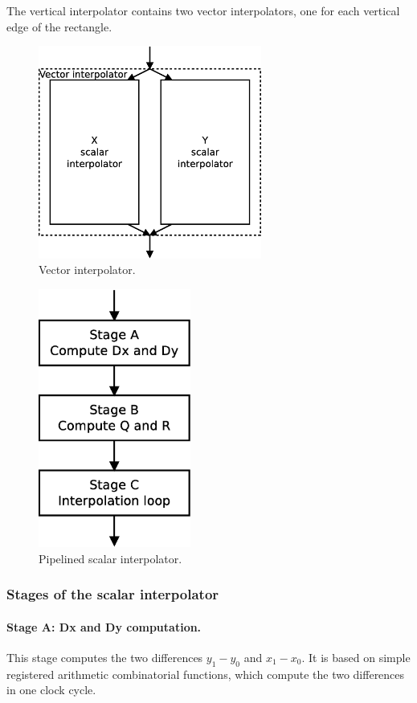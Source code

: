 \documentclass[a4paper,11pt]{kthesis}
\begin{document}
The vertical interpolator contains two vector interpolators, one for each vertical edge of the rectangle.

\begin{figure}[htp]
\centering
\includegraphics[height=70mm]{vectinter.eps}
\caption{Vector interpolator.}
\label{fig:vectinter}
\end{figure}

\begin{figure}[htp]
\centering
\includegraphics[height=85mm]{pipeinter.eps}
\caption{Pipelined scalar interpolator.}
\label{fig:pipeinter}
\end{figure}

\subsubsection{Stages of the scalar interpolator}
\paragraph{Stage A: Dx and Dy computation.} This stage computes the two differences $y_{1} - y_{0}$ and $x_{1} - x_{0}$. It is based on simple registered arithmetic combinatorial functions, which compute the two differences in one clock cycle.
\end{document}
